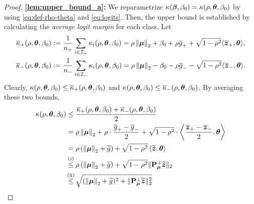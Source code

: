 \begin{proof}
    \textbf{\ref{lem:upper_bound_a}:}
    We reparametrize $\kappa({\boldsymbol{\beta}}, \beta_0) = \kappa(\rho, {\boldsymbol{\theta}}, \beta_0)$ by using \cref{eq:def-rho-theta} and \eqref{eq:logits}.
    Then, the upper bound is established by calculating the \emph{average logit margin} for each class. Let
    \begin{equation}
            \label{eq:kappa_pm}
            \begin{aligned}
                \overline\kappa_{+}(\rho, {\boldsymbol{\theta}}, \beta_0) & := \frac{1}{n_+}\sum_{i \in \mathcal{I}_+} \kappa_i(\rho, {\boldsymbol{\theta}}, \beta_0)  =
               \rho \left\|{{\boldsymbol{\mu}}}\right\|_2 + \beta_0 + \rho \overline g_{+} + \sqrt{1 - \rho^2} \langle \overline{\text{\boldmath $z$}}_{+}, {\boldsymbol{\theta}} \rangle,
                \\
                \overline\kappa_{-}(\rho, {\boldsymbol{\theta}}, \beta_0) & := \frac{1}{n_-}\sum_{i \in \mathcal{I}_-} \kappa_i(\rho, {\boldsymbol{\theta}}, \beta_0)  =
                \rho \left\|{{\boldsymbol{\mu}}}\right\|_2 - \beta_0 - \rho \overline g_{-} - \sqrt{1 - \rho^2} \langle \overline{\text{\boldmath $z$}}_{-}, {\boldsymbol{\theta}} \rangle.
            \end{aligned}
    \end{equation}
    Clearly, $\kappa(\rho, {\boldsymbol{\theta}}, \beta_0) \le \overline\kappa_+(\rho, {\boldsymbol{\theta}}, \beta_0)$ and $\kappa(\rho, {\boldsymbol{\theta}}, \beta_0) \le \overline\kappa_-(\rho, {\boldsymbol{\theta}}, \beta_0)$. By averaging these two bounds,
    \begin{align}
        \kappa(\rho, \vtheta, \beta_0) & \le \frac{\bar\kappa_{+}(\rho, \vtheta, \beta_0) + \bar\kappa_{-}(\rho, \vtheta, \beta_0)}{2} \nonumber \\
        & = 
        \rho \norm{\vmu}_2 + \rho \cdot \frac{\bar g_+ - \bar g_-}{2} + \sqrt{1 - \rho^2} \cdot \left\< \frac{\bar\zz_{+} - \bar\zz_{-}}{2}, \vtheta \right\>
        \nonumber \\
        & = \rho \left( \norm{\vmu}_2 + \wt g \right) + \sqrt{1 - \rho^2} \left< \wt\zz, \vtheta \right\> 
        \nonumber \\
        & \overset{\mathmakebox[0pt][c]{\text{(i)}}}{\le}  \rho \left( \norm{\vmu}_2 +  \wt g \right) + \sqrt{1 - \rho^2}  \| \bP_{\vmu}^\perp \wt\zz \|_2 
        \label{eq:F_AB} \\
        & \overset{\mathmakebox[0pt][c]{\text{(ii)}}}{\le} \sqrt{ ( \norm{\vmu}_2 + \wt g )^2 + \| \bP_{\vmu}^\perp \wt\zz \|_2^2 }

\end{align}
\end{proof}
